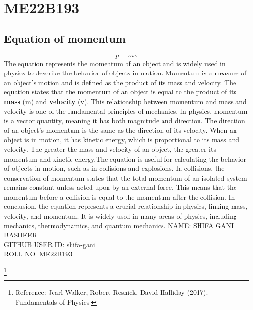 \documentclass{article}
\begin{document}
\section{ME22B193}
\subsection{Equation of momentum}
\label{eqn}
\begin{equation}
    p=mv
\end{equation}
The equation represents the momentum of an object and is widely used in physics to describe the behavior of objects in motion. Momentum is a measure of an object's motion and is defined as the product of its mass and velocity. The equation states that the momentum of an object is equal to the product of its \textbf{ mass} (m) and \textbf{ velocity} (v). This relationship between momentum and mass and velocity is one of the fundamental principles of mechanics. In physics, momentum is a vector quantity, meaning it has both magnitude and direction. The direction of an object's momentum is the same as the direction of its velocity. When an object is in motion, it has kinetic energy, which is proportional to its mass and velocity. The greater the mass and velocity of an object, the greater its momentum and kinetic energy.The equation is useful for calculating the behavior of objects in motion, such as in collisions and explosions. In collisions, the conservation of momentum states that the total momentum of an isolated system remains constant unless acted upon by an external force. This means that the momentum before a collision is equal to the momentum after the collision. In conclusion, the equation represents a crucial relationship in physics, linking mass, velocity, and momentum. It is widely used in many areas of physics, including mechanics, thermodynamics, and quantum mechanics.
NAME: SHIFA GANI BASHEER\\
GITHUB USER ID: shifa-gani\\
ROLL NO: ME22B193

\footnote{Reference:  Jearl Walker, Robert Resnick, David Halliday (2017). Fundamentals of Physics.}
\end{document}
